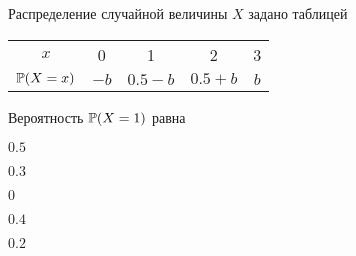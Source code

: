 
\begin{question}
Распределение случайной величины \(X\) задано таблицей

\begin{center}
\begin{tabular}{ccccc}
\toprule
$x$ & 0 & 1 & 2 & 3 \\ 
$\P(X=x)$ & $-b$ & $0.5-b$ & $0.5+b$ & $b$ \\
\bottomrule
\end{tabular}
\end{center}

Вероятность \(\P(X=1)\) равна
\begin{answerlist}
  \item \(0.5\)
  \item \(0.3\)
  \item \(0\)
  \item \(0.4\)
  \item \(0.2\)
\end{answerlist}
\end{question}


